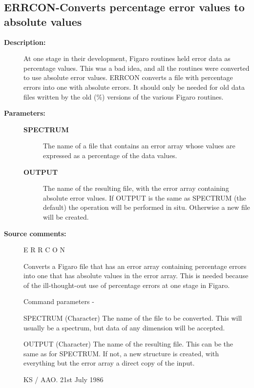 \begin{description}
\subsection{ERRCON-\label{ERRCON}Converts percentage error values to absolute values}
\begin{description}

\item [\textbf{Description:}]
 At one stage in their development, Figaro routines held error data
 as percentage values.  This was a bad idea, and all the routines
 were converted to use absolute error values.  ERRCON converts a
 file with percentage errors into one with absolute errors.  It
 should only be needed for old data files written by the old (\%)
 versions of the various Figaro routines.

\item [\textbf{Parameters:}]
\begin{description}
\item [\textbf{SPECTRUM}]
 The name of a file that contains an error array whose
 values are expressed as a percentage of the data values.
\item [\textbf{OUTPUT}]
 The name of the resulting file, with the error array
 containing absolute error values.  If OUTPUT is the
 same as SPECTRUM (the default) the operation will be
 performed in situ.  Otherwise a new file will be created.
\end{description}

\item [\textbf{Source comments:}]
\begin{terminalv}
 E R R C O N

 Converts a Figaro file that has an error array containing
 percentage errors into one that has absolute values in the
 error array.  This is needed because of the ill-thought-out
 use of percentage errors at one stage in Figaro.

 Command parameters -

 SPECTRUM  (Character) The name of the file to be converted.
           This will usually be a spectrum, but data of any
           dimension will be accepted.

 OUTPUT    (Character) The name of the resulting file. This
           can be the same as for SPECTRUM. If not, a new
           structure is created, with everything but the error
           array a direct copy of the input.

                                  KS / AAO. 21st July 1986
\end{terminalv}
\end{description}

\end{description}
